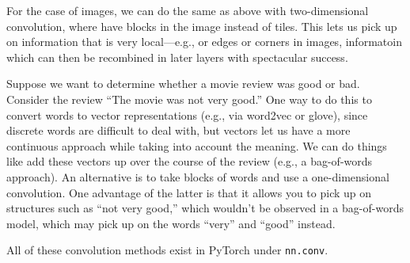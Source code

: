 \documentclass{article}
\begin{document}
\begin{example}
  For the case of images, we can do the same as above with two-dimensional convolution, where have blocks in the image instead of tiles. This lets us pick up on information that is very local---e.g., or edges or corners in images, informatoin which can then be recombined in later layers with spectacular success.
\end{example}

\begin{example}
  Suppose we want to determine whether a movie review was good or bad. Consider the review ``The movie was not very good.'' One way to do this to convert words to vector representations (e.g., via word2vec or glove), since discrete words are difficult to deal with, but vectors let us have a more continuous approach while taking into account the meaning. We can do things like add these vectors up over the course of the review (e.g., a bag-of-words approach). An alternative is to take blocks of words and use a one-dimensional convolution. One advantage of the latter is that it allows you to pick up on structures such as ``not very good,'' which wouldn't be observed in a bag-of-words model, which may pick up on the words ``very'' and ``good'' instead.
\end{example}

\begin{remark}
All of these convolution methods exist in PyTorch under \texttt{nn.conv}.
\end{remark}
\end{document}
